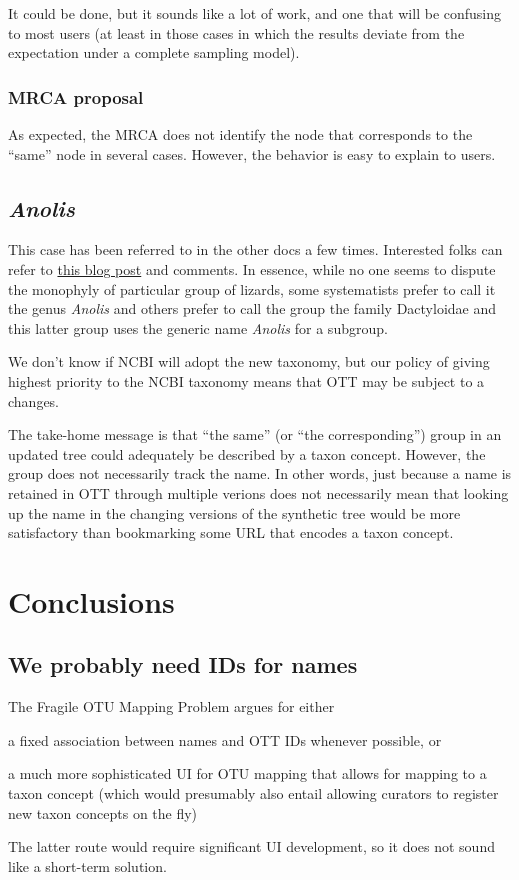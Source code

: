 \documentclass[11pt]{article}
\newcommand{\fragileOTUMapping}{Fragile OTU Mapping Problem\xspace}
\begin{document}
It could be done, but it sounds like a lot of work, and one that will be confusing to
  most users (at least in those cases in which the results deviate from the 
  expectation under a complete sampling model).

\subsubsection{MRCA proposal}
As expected, the MRCA does not identify the node that corresponds to the ``same''
  node in several cases.
However, the behavior is easy to explain to users.

\subsection{{\em Anolis}}
This case has been referred to in the other docs a few times.
Interested folks can refer to \href{http://www.anoleannals.org/2015/11/04/taxonomic-splitting-revisited-when-should-genera-be-subdivided/}{this blog post} and comments.
In essence, while no one seems to dispute the monophyly of particular
  group of lizards, some systematists prefer to call it the genus
  {\em Anolis} and others prefer to call the group the family Dactyloidae
  and this latter group uses the generic name {\em Anolis} for a subgroup.

We don't know if NCBI will adopt the new taxonomy, but our policy of giving
  highest priority to the NCBI taxonomy means that OTT may be subject to
  a changes.

The take-home message is that ``the same'' (or ``the corresponding'')
  group in an updated tree could adequately be described by a
  taxon concept.
However, the group does not necessarily track the name.
In other words, just because a name is retained in OTT through multiple
  verions does not necessarily mean that looking up the name in the
  changing versions of the synthetic tree would be more satisfactory than
  bookmarking some URL that encodes a taxon concept.

\section{Conclusions}
\subsection{We probably need IDs for names}
The \fragileOTUMapping argues for either
\begin{compactenum}
  \item a fixed association between names and OTT IDs whenever possible, or
  \item a much more sophisticated UI for OTU mapping that allows for mapping
    to a taxon concept (which would presumably also entail allowing curators to
    register new taxon concepts on the fly)
\end{compactenum}
The latter route would require significant UI development, so
  it does not sound like a short-term solution.
\end{document}
